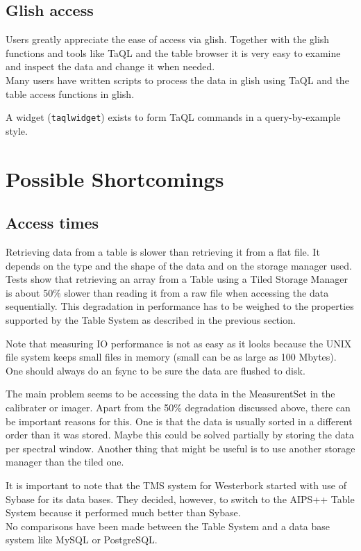 \subsection{Glish access}
Users greatly appreciate the ease of access via glish. Together with
the glish functions and tools like TaQL and the table browser it is
very easy to examine and inspect the data and change it when needed.
\\Many users have written scripts to process the data in glish using 
TaQL and the table access functions in glish.

A widget (\texttt{taqlwidget}) exists to form TaQL
commands in a query-by-example style.


\section{Possible Shortcomings}

\subsection{Access times}
Retrieving data from a table is slower than retrieving it from a flat
file. It depends on the type and the shape of the data and on the
storage manager used. Tests show that retrieving an array from a Table
using a Tiled Storage Manager is about 50\% slower than reading it
from a raw file when accessing the data sequentially.
This degradation in performance has to be weighed to the properties
supported by the Table System as described in the previous section.

Note that measuring IO performance is not as easy as it looks because
the UNIX file system keeps small files in memory (small can be as
large as 100 Mbytes). One should always do an fsync to be sure the
data are flushed to disk.

The main problem seems to be accessing the data in the MeasurentSet
in the calibrater or imager. Apart from the 50\% degradation discussed
above, there can be important reasons for this. One is that the data
is usually sorted in a different order than it was stored.
Maybe this could be solved partially by storing the data per spectral
window. Another thing that might be useful is to use another storage
manager than the tiled one.

It is important to note that the TMS system for Westerbork started
with use of Sybase for its data bases. They decided, however, to
switch to the AIPS++ Table System because it performed much better
than Sybase.
\\No comparisons have been made between the Table System and a
data base system like MySQL or PostgreSQL.

